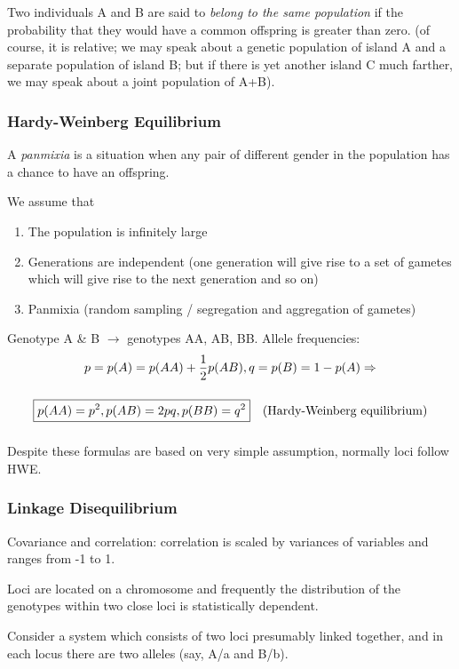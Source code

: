 \documentclass[main.tex]{subfiles}
\begin{document}
Two individuals A and B are said to \emph{belong to the same population} if the probability that they would have a common offspring is greater than zero.
(of course, it is relative; we may speak about a genetic population of island A and a separate population of island B; but if there is yet another island C much farther, we may speak about a joint population of A+B).

\subsubsection{Hardy-Weinberg Equilibrium}

A \emph{panmixia} is a situation when any pair of different gender in the population has a chance to have an offspring.

We assume that
\begin{enumerate}[noitemsep]
    \item The population is infinitely large
    \item Generations are independent (one generation will give rise to a set of gametes which will give rise to the next generation and so on)
    \item Panmixia (random sampling / segregation and aggregation of gametes)
\end{enumerate}

Genotype A \& B $ \rightarrow $ genotypes AA, AB, BB.
Allele frequencies:
\begin{gather*}
	p = p(A) = p(AA) + \frac{1}{2} p(AB), \medskip q = p(B) = 1 - p(A) \medskip \Rightarrow \\ \medskip \boxed{ p(AA) = p^2, p(AB) = 2pq, p(BB) = q^2 } \quad \text{(Hardy-Weinberg equilibrium)}
\end{gather*}

Despite these formulas are based on very simple assumption, normally loci follow HWE.

\subsubsection{Linkage Disequilibrium}

Covariance and correlation: correlation is scaled by variances of variables and ranges from -1 to 1.

Loci are located on a chromosome and frequently the distribution of the genotypes within two close loci is statistically dependent.

Consider a system which consists of two loci presumably linked together, and in each locus there are two alleles (say, A/a and B/b).
\end{document}
